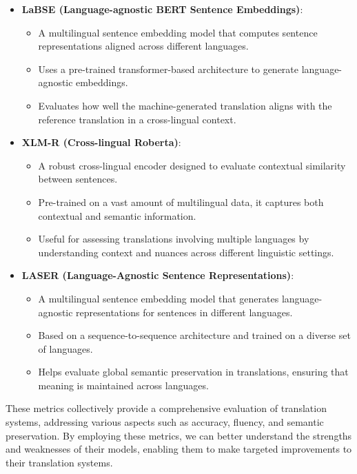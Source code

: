 \documentclass[letterpaper,11pt]{report}
\begin{document}
\begin{itemize}
    \item \textbf{LaBSE (Language-agnostic BERT Sentence Embeddings)}: 
    \begin{itemize}
        \item A multilingual sentence embedding model that computes sentence representations aligned across different languages.
        \item Uses a pre-trained transformer-based architecture to generate language-agnostic embeddings.
        \item Evaluates how well the machine-generated translation aligns with the reference translation in a cross-lingual context.
    \end{itemize}
    
    \item \textbf{XLM-R (Cross-lingual Roberta)}: 
    \begin{itemize}
        \item A robust cross-lingual encoder designed to evaluate contextual similarity between sentences.
        \item Pre-trained on a vast amount of multilingual data, it captures both contextual and semantic information.
        \item Useful for assessing translations involving multiple languages by understanding context and nuances across different linguistic settings.
    \end{itemize}
    
    \item \textbf{LASER (Language-Agnostic Sentence Representations)}: 
    \begin{itemize}
        \item A multilingual sentence embedding model that generates language-agnostic representations for sentences in different languages.
        \item Based on a sequence-to-sequence architecture and trained on a diverse set of languages.
        \item Helps evaluate global semantic preservation in translations, ensuring that meaning is maintained across languages.
    \end{itemize}
    
\end{itemize}

These metrics collectively provide a comprehensive evaluation of translation systems, addressing various aspects such as accuracy, fluency, and semantic preservation. By employing these metrics, we can better understand the strengths and weaknesses of their models, enabling them to make targeted improvements to their translation systems.
\end{document}
